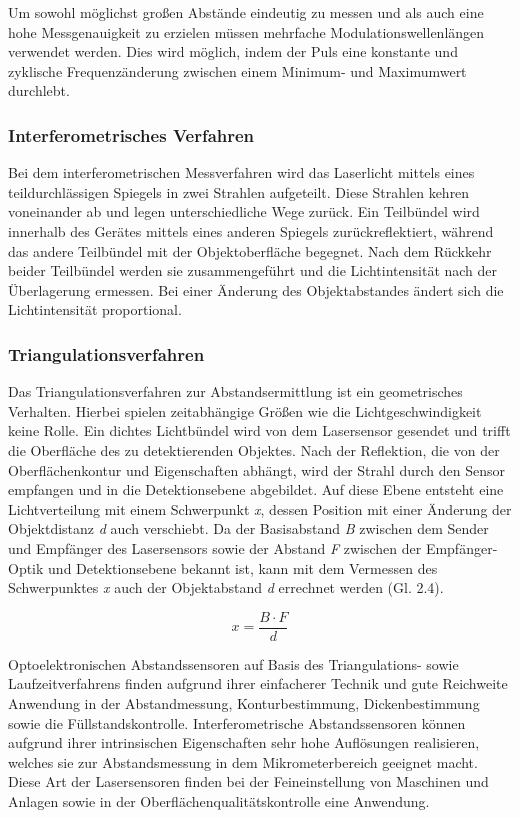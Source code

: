 Um sowohl möglichst großen Abstände eindeutig zu messen und als auch eine hohe Messgenauigkeit zu erzielen müssen mehrfache Modulationswellenlängen verwendet werden. Dies wird möglich, indem der Puls eine konstante und zyklische Frequenzänderung zwischen einem Minimum- und Maximumwert durchlebt. \autocite[172-173]{Hering2018}

\subsubsection{Interferometrisches Verfahren}

Bei dem interferometrischen Messverfahren wird das Laserlicht mittels eines teildurchlässigen Spiegels in zwei Strahlen aufgeteilt. Diese Strahlen kehren voneinander ab und legen unterschiedliche Wege zurück. Ein Teilbündel wird innerhalb des Gerätes mittels eines anderen Spiegels zurückreflektiert, während das andere Teilbündel mit der Objektoberfläche begegnet. Nach dem Rückkehr beider Teilbündel werden sie zusammengeführt und die Lichtintensität nach der Überlagerung ermessen. Bei einer Änderung des Objektabstandes ändert sich die Lichtintensität proportional. 

\subsubsection{Triangulationsverfahren}

Das Triangulationsverfahren zur Abstandsermittlung ist ein geometrisches Verhalten. Hierbei spielen zeitabhängige Größen wie die Lichtgeschwindigkeit keine Rolle. Ein dichtes Lichtbündel wird von dem Lasersensor gesendet und trifft die Oberfläche des zu detektierenden Objektes. Nach der Reflektion, die von der Oberflächenkontur und Eigenschaften abhängt, wird der Strahl durch den Sensor empfangen und in die Detektionsebene abgebildet. Auf diese Ebene entsteht eine Lichtverteilung mit einem Schwerpunkt \emph{x}, dessen Position mit einer Änderung der Objektdistanz \emph{d} auch verschiebt. Da der Basisabstand \emph{B} zwischen dem Sender und Empfänger des Lasersensors sowie der Abstand \emph{F} zwischen der Empfänger-Optik und Detektionsebene bekannt ist, kann mit dem Vermessen des Schwerpunktes \emph{x} auch der Objektabstand \emph{d} errechnet werden (Gl. 2.4). \autocite[170]{Hering2018}

\begin{equation}
	x = \frac{B \cdot F}{d}
\end{equation}

Optoelektronischen Abstandssensoren auf Basis des Triangulations- sowie Laufzeitverfahrens finden aufgrund ihrer einfacherer Technik und gute Reichweite Anwendung in der Abstandmessung, Konturbestimmung, Dickenbestimmung sowie die Füllstandskontrolle. Interferometrische Abstandssensoren können aufgrund ihrer intrinsischen Eigenschaften sehr hohe Auflösungen realisieren, welches sie zur Abstandsmessung in dem Mikrometerbereich geeignet macht. Diese Art der Lasersensoren finden bei der Feineinstellung von Maschinen und Anlagen sowie in der Oberflächenqualitätskontrolle eine Anwendung. \autocite[174-177]{Hering2018}

